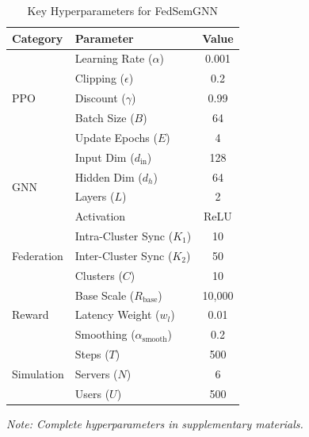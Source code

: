 
\begin{table}[t]
\centering
\caption{Key Hyperparameters for FedSemGNN}
\label{tab:hyperparameters_compact}
\begin{tabular}{@{}llc@{}}
\toprule
\textbf{Category} & \textbf{Parameter} & \textbf{Value} \\
\midrule
\multirow{5}{*}{PPO} 
& Learning Rate ($\alpha$) & 0.001 \\
& Clipping ($\epsilon$) & 0.2 \\
& Discount ($\gamma$) & 0.99 \\
& Batch Size ($B$) & 64 \\
& Update Epochs ($E$) & 4 \\
\midrule
\multirow{4}{*}{GNN} 
& Input Dim ($d_{\text{in}}$) & 128 \\
& Hidden Dim ($d_h$) & 64 \\
& Layers ($L$) & 2 \\
& Activation & ReLU \\
\midrule
\multirow{3}{*}{Federation} 
& Intra-Cluster Sync ($K_1$) & 10 \\
& Inter-Cluster Sync ($K_2$) & 50 \\
& Clusters ($C$) & 10 \\
\midrule
\multirow{3}{*}{Reward} 
& Base Scale ($R_{\text{base}}$) & 10,000 \\
& Latency Weight ($w_l$) & 0.01 \\
& Smoothing ($\alpha_{\text{smooth}}$) & 0.2 \\
\midrule
\multirow{3}{*}{Simulation} 
& Steps ($T$) & 500 \\
& Servers ($N$) & 6 \\
& Users ($U$) & 500 \\
\bottomrule
\end{tabular}
\vspace{0.1cm}
\footnotesize
\textit{Note: Complete hyperparameters in supplementary materials.}
\end{table}
